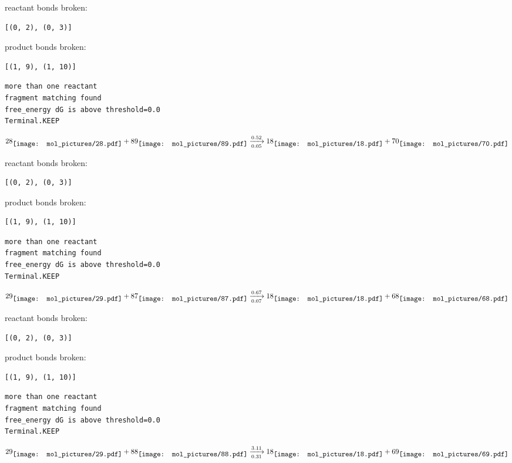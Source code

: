 \documentclass{article}
\begin{document}
reactant bonds broken:\begin{verbatim}
[(0, 2), (0, 3)]
\end{verbatim}
product bonds broken:\begin{verbatim}
[(1, 9), (1, 10)]
\end{verbatim}




\vspace{1cm}
\begin{verbatim}
more than one reactant
fragment matching found
free_energy dG is above threshold=0.0
Terminal.KEEP
\end{verbatim}
$$
28
\raisebox{-.5\height}{\texttt{[image: mol\_pictures/28.pdf]}}
+
89
\raisebox{-.5\height}{\texttt{[image: mol\_pictures/89.pdf]}}
\xrightarrow[0.05]{0.52}
18
\raisebox{-.5\height}{\texttt{[image: mol\_pictures/18.pdf]}}
+
70
\raisebox{-.5\height}{\texttt{[image: mol\_pictures/70.pdf]}}
$$


reactant bonds broken:\begin{verbatim}
[(0, 2), (0, 3)]
\end{verbatim}
product bonds broken:\begin{verbatim}
[(1, 9), (1, 10)]
\end{verbatim}




\vspace{1cm}
\begin{verbatim}
more than one reactant
fragment matching found
free_energy dG is above threshold=0.0
Terminal.KEEP
\end{verbatim}
$$
29
\raisebox{-.5\height}{\texttt{[image: mol\_pictures/29.pdf]}}
+
87
\raisebox{-.5\height}{\texttt{[image: mol\_pictures/87.pdf]}}
\xrightarrow[0.07]{0.67}
18
\raisebox{-.5\height}{\texttt{[image: mol\_pictures/18.pdf]}}
+
68
\raisebox{-.5\height}{\texttt{[image: mol\_pictures/68.pdf]}}
$$


reactant bonds broken:\begin{verbatim}
[(0, 2), (0, 3)]
\end{verbatim}
product bonds broken:\begin{verbatim}
[(1, 9), (1, 10)]
\end{verbatim}




\vspace{1cm}
\begin{verbatim}
more than one reactant
fragment matching found
free_energy dG is above threshold=0.0
Terminal.KEEP
\end{verbatim}
$$
29
\raisebox{-.5\height}{\texttt{[image: mol\_pictures/29.pdf]}}
+
88
\raisebox{-.5\height}{\texttt{[image: mol\_pictures/88.pdf]}}
\xrightarrow[0.31]{3.11}
18
\raisebox{-.5\height}{\texttt{[image: mol\_pictures/18.pdf]}}
+
69
\raisebox{-.5\height}{\texttt{[image: mol\_pictures/69.pdf]}}
$$
\end{document}
